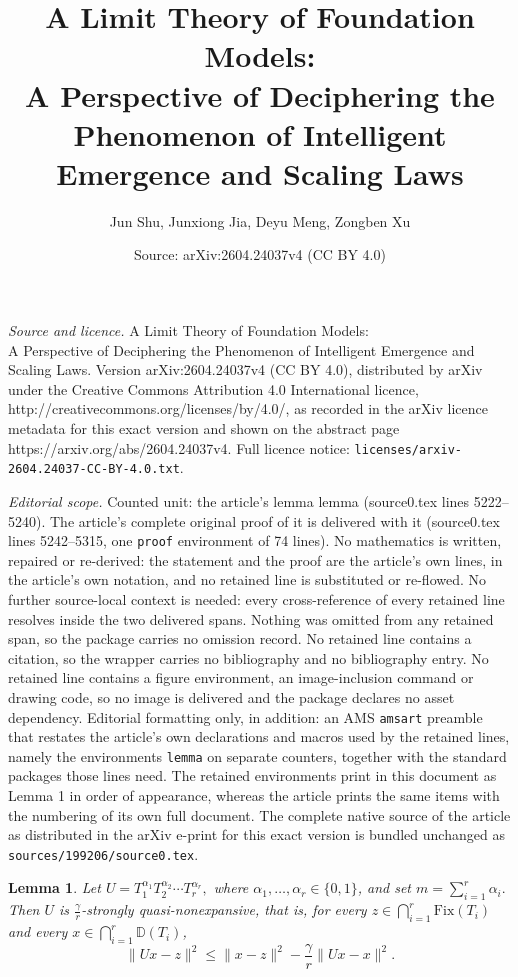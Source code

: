 \documentclass[10pt,a4paper]{amsart}
\title{A Limit Theory of Foundation Models: \\ A Perspective of Deciphering the Phenomenon of Intelligent Emergence and Scaling Laws}
\author{Jun Shu, Junxiong Jia, Deyu Meng, Zongben Xu}
\date{Source: arXiv:2604.24037v4 (CC BY 4.0)}
\newtheorem{lemma}{Lemma}
\begin{document}
\maketitle

\noindent\emph{Source and licence.} A Limit Theory of Foundation Models: \\ A Perspective of Deciphering the Phenomenon of Intelligent Emergence and Scaling Laws. Version arXiv:2604.24037v4 (CC BY 4.0), distributed by arXiv under the Creative Commons Attribution 4.0 International licence, http://creativecommons.org/licenses/by/4.0/, as recorded in the arXiv licence metadata for this exact version and shown on the abstract page https://arxiv.org/abs/2604.24037v4. Full licence notice: \texttt{licenses/arxiv-2604.24037-CC-BY-4.0.txt}.\par\smallskip

\noindent\textit{Editorial scope.} Counted unit: the article's lemma lemma (source0.tex lines 5222--5240). The article's complete original proof of it is delivered with it (source0.tex lines 5242--5315, one \texttt{proof} environment of 74 lines). No mathematics is written, repaired or re-derived: the statement and the proof are the article's own lines, in the article's own notation, and no retained line is substituted or re-flowed.  No further source-local context is needed: every cross-reference of every retained line resolves inside the two delivered spans.  Nothing was omitted from any retained span, so the package carries no omission record.  No retained line contains a citation, so the wrapper carries no bibliography and no bibliography entry.  No retained line contains a figure environment, an image-inclusion command or drawing code, so no image is delivered and the package declares no asset dependency.  Editorial formatting only, in addition: an AMS \texttt{amsart} preamble that restates the article's own declarations and macros used by the retained lines, namely the environments \texttt{lemma} on separate counters, together with the standard packages those lines need.  The retained environments print in this document as Lemma 1 in order of appearance, whereas the article prints the same items with the numbering of its own full document.  The complete native source of the article as distributed in the arXiv e-print for this exact version is bundled unchanged as \texttt{sources/199206/source0.tex}.
\begin{lemma}
	Let
	\(
	U=T_1^{\alpha_1}T_2^{\alpha_2}\cdots T_r^{\alpha_r},
	\)
	where \(\alpha_1,\ldots,\alpha_r\in \{0,1\}\), and set
	\(
	m=\sum_{i=1}^r \alpha_i .
	\)
	Then \(U\) is \(\frac{\gamma}{r}\)-strongly quasi-nonexpansive, that is, for every
	\(z \in \bigcap_{i=1}^r \mathrm{Fix}(T_i)\) and every \(x\in \bigcap_{i=1}^r \mathbb{D}(T_i)\),
	\[
	\|Ux-z\|^2
	\leq
	\|x-z\|^2
	-
	\frac{\gamma}{r}\|Ux-x\|^2 .
	\]
\end{lemma}
\end{document}
